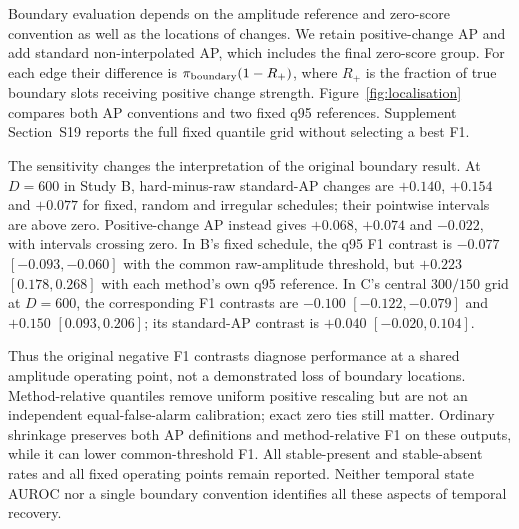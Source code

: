 Boundary evaluation depends on the amplitude reference and zero-score
convention as well as the locations of changes. We retain positive-change
AP and add standard non-interpolated AP, which includes the final zero-score
group. For each edge their difference is
$\pi_{\rm boundary}(1-R_+)$, where $R_+$ is the fraction of true boundary
slots receiving positive change strength. Figure~\ref{fig:localisation}
compares both AP conventions and two fixed q95 references. Supplement
Section~S19 reports the full fixed quantile grid without selecting a best F1.

The sensitivity changes the interpretation of the original boundary result.
At $D=600$ in Study B, hard-minus-raw standard-AP changes are
$+0.140$, $+0.154$ and $+0.077$ for fixed, random and irregular schedules;
their pointwise intervals are above zero. Positive-change AP instead gives
$+0.068$, $+0.074$ and $-0.022$, with intervals crossing zero.
In B's fixed schedule, the q95 F1 contrast is $-0.077$
$[-0.093,-0.060]$ with the common raw-amplitude threshold, but
$+0.223$ $[0.178,0.268]$ with each method's own q95 reference.
In C's central $300/150$ grid at $D=600$, the corresponding F1 contrasts
are $-0.100$ $[-0.122,-0.079]$ and $+0.150$ $[0.093,0.206]$;
its standard-AP contrast is $+0.040$ $[-0.020,0.104]$.

Thus the original negative F1 contrasts diagnose performance at a shared
amplitude operating point, not a demonstrated loss of boundary locations.
Method-relative quantiles remove uniform positive rescaling but are not an
independent equal-false-alarm calibration; exact zero ties still matter.
Ordinary shrinkage preserves both AP definitions and method-relative F1 on
these outputs, while it can lower common-threshold F1. All stable-present
and stable-absent rates and all fixed operating points remain reported.
Neither temporal state AUROC nor a single boundary convention identifies
all these aspects of temporal recovery.
